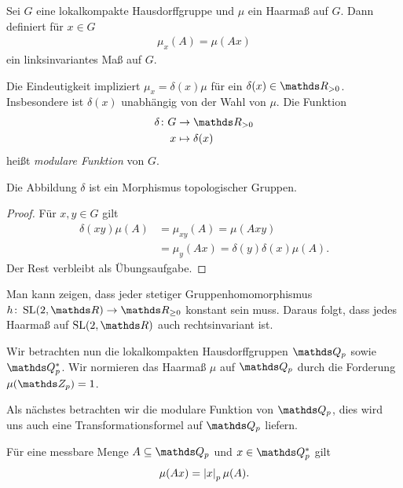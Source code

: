 \begin{defi}
Sei $G$ eine lokalkompakte Hausdorffgruppe und $\mu$ ein Haarmaß auf $G$.
Dann definiert für $x\in G$
\begin{align*}
\mu_x(A)=\mu(Ax)
\end{align*}
ein linksinvariantes Maß auf $G$.
\end{defi}

\begin{defi}
Die Eindeutigkeit impliziert $\mu_x=\delta(x) \mu$ für ein $\delta(x)\in \R_{> 0}$.
Insbesondere ist $\delta(x)$ unabhängig von der Wahl von $\mu$.
Die Funktion
\begin{align*}
\delta \colon G &\to \R_{> 0}\\
x &\mapsto \delta(x)
\end{align*}
heißt \emph{modulare Funktion} von $G$.
\end{defi}

\begin{prop}
Die Abbildung $\delta$ ist ein Morphismus topologischer Gruppen.
\end{prop}
\begin{proof}
Für $x,y\in G$ gilt
\begin{align*}
\delta(xy)\mu(A)&=\mu_{xy}(A)=\mu(Axy)\\
&=\mu_y(Ax)=\delta(y)\delta(x)\mu(A).
\end{align*}
Der Rest verbleibt als Übungsaufgabe.
\end{proof}

\begin{bsp}
Man kann zeigen, dass jeder stetiger Gruppenhomomorphismus $h \colon \SL(2,\R)\to \R_{\geq 0}$ konstant sein muss.
Daraus folgt, dass jedes Haarmaß auf $\SL(2,\R)$ auch rechtsinvariant ist.
\end{bsp}

Wir betrachten nun die lokalkompakten Hausdorffgruppen $\Q_p$ sowie $\Q_p^\ast$.
Wir normieren das Haarmaß $\mu$ auf $\Q_p$ durch die Forderung $\mu(\Z_p)=1$.

Als nächstes betrachten wir die modulare Funktion von $\Q_p$, 
dies wird uns auch eine Transformationsformel auf $\Q_p$ liefern.

\begin{prop}
Für eine messbare Menge $A \subseteq \Q_p$ und $x \in \Q_p^\ast$ gilt
\begin{align*}
\mu(Ax)=\left\vert x\right\vert_p\mu(A).
\end{align*}
\end{prop}

